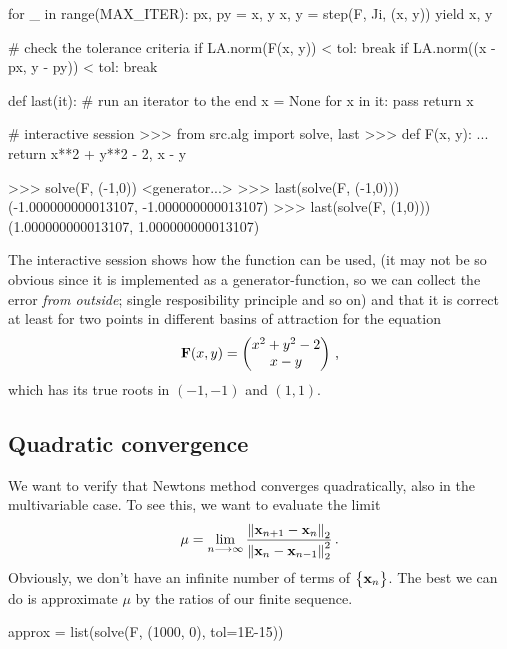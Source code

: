 \documentclass[12pt]{article}
\begin{document}
\begin{multicols}{2}
\begin{python}[caption={Newton's method}]
    for _ in range(MAX_ITER):
        px, py = x, y
        x,  y  = step(F, Ji, (x, y))
        yield x, y

        # check the tolerance criteria
        if LA.norm(F(x, y)) < tol:
            break
        if LA.norm((x - px, y - py)) < tol:
            break

def last(it):
    # run an iterator to the end
    x = None
    for x in it: pass
    return x
    \end{python}
    \vspace{-0.5\baselineskip}
    \begin{python}[frame=b,numbers=none]
# interactive session
>>> from src.alg import solve, last
>>> def F(x, y):
...     return x**2 + y**2 - 2, x - y

>>> solve(F, (-1,0))
<generator...>
>>> last(solve(F, (-1,0)))
(-1.000000000013107, -1.000000000013107)
>>> last(solve(F, (1,0)))
(1.000000000013107, 1.000000000013107)
    \end{python}
    The interactive session shows how the function can be used,
    (it may not be so obvious since it is implemented
    as a generator-function, so we can collect the error {\em from outside};
    single resposibility principle and so on)
    and that it is correct at least for two points in different
    basins of attraction for the equation
    \[
        \vec F(x, y) = \begin{pmatrix}
            x^2 + y^2 - 2 \\
            x - y
        \end{pmatrix} \,\text,
    \]
    which has its true roots in $(-1, -1)$ and $(1, 1)$.

    \subsection*{Quadratic convergence}
    We want to verify that Newtons method converges quadratically,
    also in the multivariable case.
    To see this, we want to evaluate the limit
    \[
        \mu = \lim_{n \longrightarrow \infty}
            \frac{\Norm[2]{\vec x_{n+1} - \vec x_n}}
                 {\Norm[2]{\vec x_n - \vec x_{n-1}}^2}
        \,\text.
    \]
    Obviously, we don't have an infinite number of terms of $\Seq{\vec x_n}$.
    The best we can do is approximate $\mu$ by the ratios of our finite sequence.
    \begin{python}[
        caption={Computing the sequence of ratios}
    ]
approx = list(solve(F, (1000, 0), tol=1E-15))


\end{python}
\end{multicols}
\end{document}
